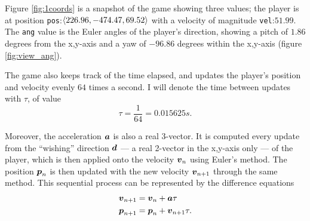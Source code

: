 Figure \ref{fig:1coords} is a snapshot of the game showing three values; the player is at position \verb|pos|:$\left\langle 226.96, -474.47, 69.52 \right\rangle$ with a velocity of magnitude \verb|vel|:$51.99$. The \verb|ang| value is the Euler angles of the player's direction, showing a pitch of $1.86$ degrees from the x,y-axis and a yaw of $-96.86$ degrees within the x,y-axis (figure \ref{fig:view_ang}).


The game also keeps track of the time elapsed, and updates the player's position and velocity evenly $64$ times a second. I will denote the time between updates with $\tau$, of value
\[
    \tau = \frac{1}{64} = 0.015625 \si{s}.
\]



Moreover, the acceleration $\boldsymbol{a}$ is also a real 3-vector. It is computed every update from the ``wishing'' direction $\boldsymbol{d}$ --- a real 2-vector in the x,y-axis only --- of the player, which is then applied onto the velocity $\boldsymbol{v}_n$ using Euler's method. The position $\boldsymbol{p}_n$ is then updated with the new velocity $\boldsymbol{v}_{n+1}$ through the same method. This sequential process can be represented by the difference equations
\begin{align}
    \boldsymbol{v}_{n+1} &= \boldsymbol{v}_n + \boldsymbol{a} \tau\\
    \boldsymbol{p}_{n+1} &= \boldsymbol{p}_n + \boldsymbol{v}_{n+1} \tau.
\end{align}

